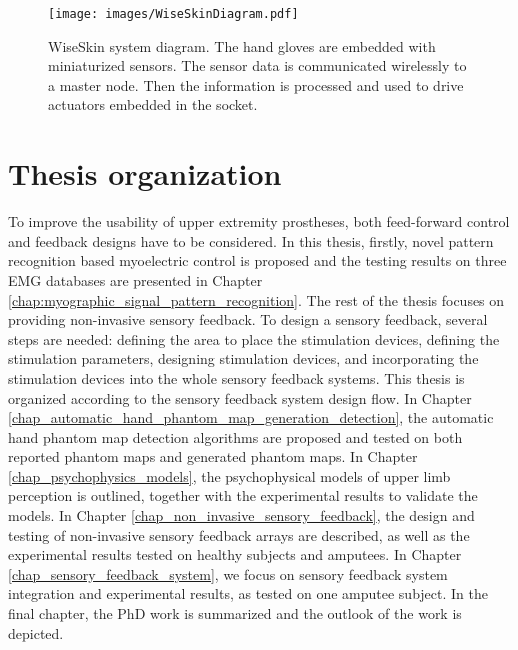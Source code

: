  \begin{figure}[hbt!]
    \centering
        \texttt{[image: images/WiseSkinDiagram.pdf]}
        \caption{WiseSkin system diagram. The hand gloves are embedded with miniaturized sensors. The sensor data is communicated wirelessly to a master node. Then the information is processed and used to drive actuators embedded in the socket.  }
        \label{fig:wiseskin_system_diagram}
\end{figure}




\section{Thesis organization}
To improve the usability of upper extremity prostheses, both feed-forward control and feedback designs have to be considered. In this thesis, firstly, novel pattern recognition based myoelectric control is proposed and the testing results on three EMG databases are presented in Chapter \ref{chap:myographic_signal_pattern_recognition}. 
The rest of the thesis focuses on providing non-invasive sensory feedback.
To design a sensory feedback, several steps are needed: defining the area to place the stimulation devices, defining the stimulation parameters, designing stimulation devices, and incorporating the stimulation devices into the whole sensory feedback systems. This thesis is organized according to the sensory feedback system design flow.
In Chapter \ref{chap_automatic_hand_phantom_map_generation_detection},  the automatic hand phantom map detection algorithms are proposed and tested on both reported phantom maps and generated phantom maps.
In Chapter \ref{chap_psychophysics_models}, the psychophysical models of upper limb perception is outlined, together with the experimental results to validate the models.
In Chapter \ref{chap_non_invasive_sensory_feedback}, the design and testing of non-invasive sensory feedback arrays are described, as well as the experimental results tested on healthy subjects and amputees.
In Chapter \ref{chap_sensory_feedback_system}, we focus on sensory feedback system integration and experimental results, as tested on one amputee subject. 
In the final chapter, the PhD work is summarized and the outlook of the work is depicted.


